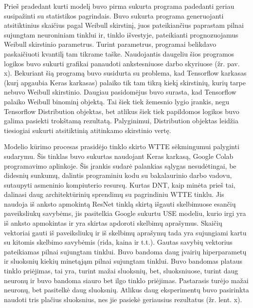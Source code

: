 \documentclass{VUMIFPSkursinis}
\begin{document}
Prieš pradedant kurti modelį buvo pirma sukurta programa padedanti geriau susipažinti su statistikos pagrindais. Buvo sukurta programa generuojanti atsitiktinius skaičius pagal Weibull skirstinį, juos pateikiančius paprastam pilnai sujungtam neuroniniam tinklui ir, tinklo išvestyje, pateikianti prognozuojamus Weibull skirstinio parametrus. Turint parametrus, programai belikdavo paskaičiuoti kvantilį tam tikrame taške. Naudojantis daugeliu šios programos logikos buvo sukurti grafikai panaudoti ankstesniuose darbo skyriuose (žr. pav. x). Bekuriant šią programą buvo susidurta su problema, kad Tensorflow karkasas (kurį apgaubia Keras karkasas) palaiko tik tam tikrą kiekį skirstinių, kurių tarpe nebuvo Weibull skirstinio. Daugiau pasidomėjus buvo surasta, kad Tensorflow palaiko Weibull binominį objektą. Tai šiek tiek žemesnio lygio įrankis, negu Tensorflow Distribution objektas, bet atlikus šiek tiek papildomos logikos buvo galima pasiekti trokštamą rezultatą. Palyginimui, Distribution objektas leidžia tiesiogiai sukurti atsitiktinią atitinkamo skirstinio vertę. 

Modelio kūrimo procesas prasidėjo tinklo skirto WTTE sėkmingumui palyginti sudarymu. Šis tinklas buvo sukurtas naudojant Keras karkasą, Google Colab programavimo aplinkoje. Šis įrankis sudarė palankias sąlygas nesudėtingai, be didesnių sunkumų, dalintis programiniu kodu su bakalaurinio darbo vadovu, sutaupyti asmeninio kompiuterio resursų. Kurtas DNT, kaip minėta prieš tai, dalinasi daug architektūrinių sprendimų su pagrindiniu WTTE tinklu. Jis naudoja iš anksto apmokintą ResNet tinklą skirtą išgauti skelbimuose esančių paveiksliukų savybėms, jis pasitelkia Google sukurtu USE modeliu, kurio irgi yra iš anksto apmokintas ir yra skirtas apdoroti skelbimų aprašymus. Skaičių vektoriai gauti iš paveiksliukų ir iš skelbimų aprašymų tada yra sujungiami kartu su kitomis skelbimo savybėmis (rida, kaina ir t.t.). Gautas savybių vektorius pateikiamas pilnai sujungtam tinklui. Buvo bandoma daug įvairių hiperparametų ir sluoksnių kiekių minetąjąm pilnai sujungtam tinklui. Buvo bandomas plataus tinklo priėjimas, tai yra, turint mažai sluoksnių, bet, sluoksniuose, turint daug neuronų ir buvo bandoma siauro bet ilgo tinklo priėjimas. Pastarasis turėjo mažai neuronų, bet pasitelkė daug sluoksnių. Atlikus daug eksperimentų buvo pasirinkta naudoti tris plačius sluoksnius, nes jie pasiekė geriausius rezultatus (žr. lent. x).
\end{document}
